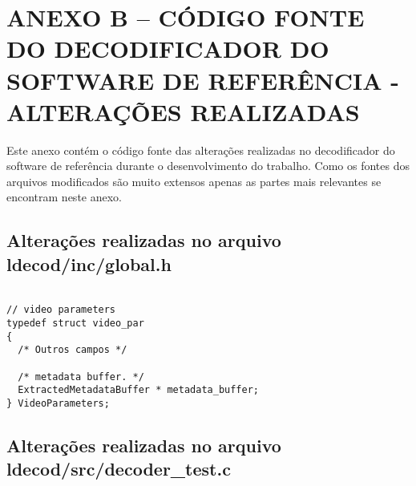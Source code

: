 \chapter{ANEXO B -- CÓDIGO FONTE DO DECODIFICADOR DO SOFTWARE DE REFERÊNCIA - ALTERAÇÕES REALIZADAS}

Este anexo contém o código fonte das alterações realizadas no decodificador do software de referência durante o desenvolvimento do trabalho. Como os fontes dos arquivos modificados são muito extensos apenas as partes mais relevantes se encontram neste anexo.

\section{Alterações realizadas no arquivo ldecod/inc/global.h}

\begin{lstlisting}

// video parameters
typedef struct video_par
{
  /* Outros campos */

  /* metadata buffer. */
  ExtractedMetadataBuffer * metadata_buffer;
} VideoParameters;

\end{lstlisting}

\section{Alterações realizadas no arquivo ldecod/src/decoder\_test.c}

